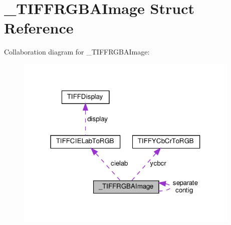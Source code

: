 \hypertarget{struct__TIFFRGBAImage}{}\section{\+\_\+\+T\+I\+F\+F\+R\+G\+B\+A\+Image Struct Reference}
\label{struct__TIFFRGBAImage}


Collaboration diagram for \+\_\+\+T\+I\+F\+F\+R\+G\+B\+A\+Image\+:
\nopagebreak
\begin{figure}[H]
\begin{center}
\leavevmode
\includegraphics[width=304pt]{struct__TIFFRGBAImage__coll__graph}
\end{center}
\end{figure}
